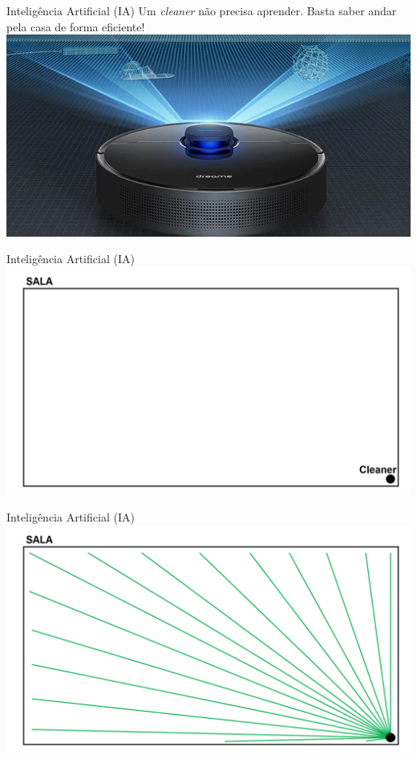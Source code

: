\documentclass{libs/ufc_format}
\begin{document}
\begin{frame}{Inteligência Artificial (IA)}
    Um \textit{cleaner} não precisa aprender. Basta saber andar pela casa de forma eficiente!\\
    \centering
    \vspace{0.5cm}
    \includegraphics[scale=0.5]{media/cleaner}
\end{frame}

\begin{frame}{Inteligência Artificial (IA)}
    \includegraphics[width=\textwidth]{media/SALA_CLEANER}
\end{frame}

\begin{frame}{Inteligência Artificial (IA)}
    \includegraphics[width=\textwidth]{media/SALA_scan}
\end{frame}
\end{document}
